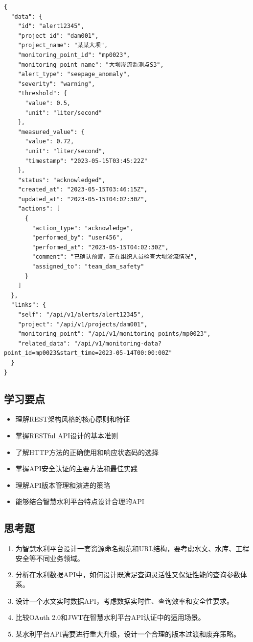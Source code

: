 \begin{lstlisting}
{
  "data": {
    "id": "alert12345",
    "project_id": "dam001",
    "project_name": "某某大坝",
    "monitoring_point_id": "mp0023",
    "monitoring_point_name": "大坝渗流监测点S3",
    "alert_type": "seepage_anomaly",
    "severity": "warning",
    "threshold": {
      "value": 0.5,
      "unit": "liter/second"
    },
    "measured_value": {
      "value": 0.72,
      "unit": "liter/second",
      "timestamp": "2023-05-15T03:45:22Z"
    },
    "status": "acknowledged",
    "created_at": "2023-05-15T03:46:15Z",
    "updated_at": "2023-05-15T04:02:30Z",
    "actions": [
      {
        "action_type": "acknowledge",
        "performed_by": "user456",
        "performed_at": "2023-05-15T04:02:30Z",
        "comment": "已确认预警，正在组织人员检查大坝渗流情况",
        "assigned_to": "team_dam_safety"
      }
    ]
  },
  "links": {
    "self": "/api/v1/alerts/alert12345",
    "project": "/api/v1/projects/dam001",
    "monitoring_point": "/api/v1/monitoring-points/mp0023",
    "related_data": "/api/v1/monitoring-data?point_id=mp0023&start_time=2023-05-14T00:00:00Z"
  }
}
\end{lstlisting}

\subsection{学习要点}\label{ux5b66ux4e60ux8981ux70b9}

\begin{itemize}
\tightlist
\item
  理解REST架构风格的核心原则和特征
\item
  掌握RESTful API设计的基本准则
\item
  了解HTTP方法的正确使用和响应状态码的选择
\item
  掌握API安全认证的主要方法和最佳实践
\item
  理解API版本管理和演进的策略
\item
  能够结合智慧水利平台特点设计合理的API
\end{itemize}

\subsection{思考题}\label{ux601dux8003ux9898}

\begin{enumerate}
\def\labelenumi{\arabic{enumi}.}
\tightlist
\item
  为智慧水利平台设计一套资源命名规范和URL结构，要考虑水文、水库、工程安全等不同业务领域。
\item
  分析在水利数据API中，如何设计既满足查询灵活性又保证性能的查询参数体系。
\item
  设计一个水文实时数据API，考虑数据实时性、查询效率和安全性要求。
\item
  比较OAuth 2.0和JWT在智慧水利平台API认证中的适用场景。
\item
  某水利平台API需要进行重大升级，设计一个合理的版本过渡和废弃策略。
\end{enumerate}

